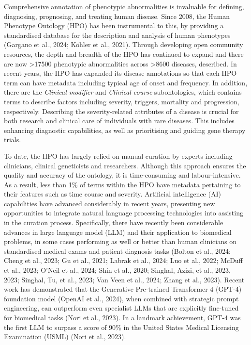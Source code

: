 \documentclass[
]{agujournal2019}
\begin{document}
Comprehensive annotation of phenotypic abnormalities is invaluable for
defining, diagnosing, prognosing, and treating human disease. Since
2008, the Human Phenotype Ontology (HPO) has been instrumental to this,
by providing a standardised database for the description and analysis of
human phenotypes (Gargano et al., 2024; Köhler et al., 2021). Through
developing open community resources, the depth and breadth of the HPO
has continued to expand and there are now \textgreater17500 phenotypic
abnormalities across \textgreater8600 diseases, described. In recent
years, the HPO has expanded its disease annotations so that each HPO
term can have metadata including typical age of onset and frequency. In
addition, there are the \emph{Clinical modifier} and \emph{Clinical
course} subontologies, which contains terms to describe factors
including severity, triggers, mortality and progression, respectively.
Describing the severity-related attributes of a disease is crucial for
both research and clinical care of individuals with rare diseases. This
includes enhancing diagnostic capabilities, as well as prioritising and
guiding gene therapy trials.

To date, the HPO has largely relied on manual curation by experts
including clinicians, clinical geneticists and researchers. Although
this approach ensures the quality and accuracy of the ontology, it is
time-consuming and labour-intensive. As a result, less than 1\% of terms
within the HPO have metadata pertaining to their features such as time
course and severity. Artificial intelligence (AI) capabilities have
advanced considerably in recent years, presenting new opportunities to
integrate natural language processing technologies into assisting in the
curation process. Specifically, there have recently been considerable
advances in large language model (LLM) and their application to
biomedical problems, in some cases performing as well or better than
human clinicians on standardised medical exams and patient diagnosis
tasks (Bolton et al., 2024; Cheng et al., 2023; Gu et al., 2021; Labrak
et al., 2024; Luo et al., 2022; McDuff et al., 2023; O'Neil et al.,
2024; Shin et al., 2020; Singhal, Azizi, et al., 2023, 2023; Singhal,
Tu, et al., 2023; Van Veen et al., 2024; Zhang et al., 2023). Recent
work has demonstrated that the Generative Pre-trained Transformer 4
(GPT-4) foundation model (OpenAI et al., 2024), when combined with
strategic prompt engineering, can outperform even specialist LLMs that
are explicitly fine-tuned for biomedical tasks (Nori et al., 2023). In a
landmark achievement, GPT-4 was the first LLM to surpass a score of 90\%
in the United States Medical Licensing Examination (USML) (Nori et al.,
2023).
\end{document}
